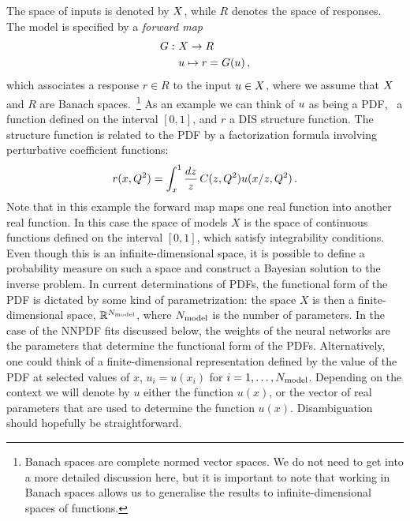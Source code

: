 The space of inputs is denoted by $X$, while $R$ denotes the space of responses.
The model is specified by a {\em forward map}
\begin{align}
  \label{eq:ForwardMap}
  G : ~& X \to R \nonumber \\
      & u \mapsto r=G(u) \, ,
\end{align}
which associates a response $r \in R$ to the input $u \in X$,
where we assume that $X$ and $R$ are Banach spaces.~\footnote{Banach
spaces are complete normed vector spaces. We do not need to get into a more
detailed discussion here, but it is important to note that working in Banach
spaces allows us to generalise the results to infinite-dimensional spaces of
functions.} As an example we can think of $u$ as being a PDF, 
\ie\ a function defined on the interval $[0,1]$, and $r$
a DIS structure function. The structure function is related to the PDF by a 
factorization formula
involving perturbative coefficient functions: 
\begin{align}
  \label{eq:DISExample}
  r(x,Q^2) = \int_x^1 \frac{dz}{z}\, C(z,Q^2) u(x/z,Q^2)\, .
\end{align}
Note that in this example the forward map maps one real function into another
real function. In this case the space of models $X$ is the space of continuous 
functions defined on the interval $[0,1]$, which satisfy integrability conditions. 
Even though this is an infinite-dimensional space, it is possible to define a 
probability measure on such a space and construct a Bayesian solution to the inverse 
problem. In current determinations of PDFs, the functional form of the PDF is 
dictated by some kind of parametrization: the space $X$ is then a finite-dimensional 
space, $\mathbb{R}^{N_{\rm model}}$, where $N_{\rm model}$ is the number of parameters. In the case of 
the NNPDF fits discussed below, the weights of the neural networks are the parameters 
that determine the functional form of the PDFs. Alternatively, one could think of a 
finite-dimensional representation defined by the value of the PDF at selected values 
of $x$, \ie $u_i=u(x_i)$ for $i=1,\ldots,N_{\rm model}$. Depending on 
the context we will denote by $u$ either the function $u(x)$, or the vector of real
parameters that are used to determine the function $u(x)$. Disambiguation should 
hopefully be straightforward. 

